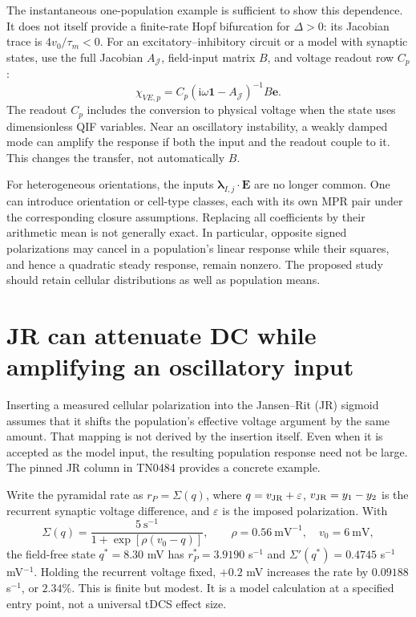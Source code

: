 \documentclass[11pt,a4paper]{article}
\newcommand{\ii}{\mathrm i}
\begin{document}
The instantaneous one-population example is sufficient to show this dependence. It does not itself provide a finite-rate Hopf bifurcation for $\Delta>0$: its Jacobian trace is $4v_0/\tau_m<0$. For an excitatory--inhibitory circuit or a model with synaptic states, use the full Jacobian $A_{\mathcal J}$, field-input matrix $B$, and voltage readout row $C_p$:
\begin{equation}
\chi_{VE,p}=C_p(\ii\omega\mathbf1-A_{\mathcal J})^{-1}B\mathbf e.
\label{eq:networkresolvent}
\end{equation}
The readout $C_p$ includes the conversion to physical voltage when the state uses dimensionless QIF variables. Near an oscillatory instability, a weakly damped mode can amplify the response if both the input and the readout couple to it. This changes the transfer, not automatically $B$.

For heterogeneous orientations, the inputs $\boldsymbol\lambda_{I,j}\cdot\mathbf E$ are no longer common. One can introduce orientation or cell-type classes, each with its own MPR pair under the corresponding closure assumptions. Replacing all coefficients by their arithmetic mean is not generally exact. In particular, opposite signed polarizations may cancel in a population's linear response while their squares, and hence a quadratic steady response, remain nonzero. The proposed study should retain cellular distributions as well as population means.

\section{JR can attenuate DC while amplifying an oscillatory input}

Inserting a measured cellular polarization into the Jansen--Rit (JR) sigmoid assumes that it shifts the population's effective voltage argument by the same amount. That mapping is not derived by the insertion itself. Even when it is accepted as the model input, the resulting population response need not be large. The pinned JR column in TN0484 provides a concrete example.

Write the pyramidal rate as $r_P=\Sigma(q)$, where $q=v_{\rm JR}+\varepsilon$, $v_{\rm JR}=y_1-y_2$ is the recurrent synaptic voltage difference, and $\varepsilon$ is the imposed polarization. With
\begin{equation}
\Sigma(q)=\frac{5~\mathrm{s}^{-1}}{1+\exp[\rho(v_0-q)]},\qquad
\rho=0.56~\mathrm{mV}^{-1},\quad v_0=6~\mathrm{mV},
\end{equation}
the field-free state $q^*=8.30$ mV has $r_P^*=3.9190$ s$^{-1}$ and $\Sigma'(q^*)=0.4745$ s$^{-1}$mV$^{-1}$. Holding the recurrent voltage fixed, $+0.2$ mV increases the rate by $0.09188$ s$^{-1}$, or $2.34\%$. This is finite but modest. It is a model calculation at a specified entry point, not a universal tDCS effect size.
\end{document}
